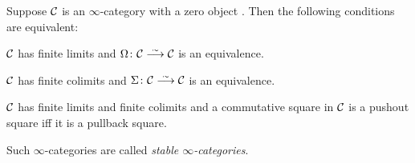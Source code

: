 \begin{propdef}\label{propdef:StableInftyCategory}
	Suppose $\mathcal{C}$ is an $\infty$-category with a zero object . Then the following conditions are equivalent:
	\begin{alphanumerate}
		\item $\mathcal{C}$ has finite limits and $\Omega\colon \Cc\isomorphism\Cc$ is an equivalence.
		\item $\mathcal{C}$ has finite colimits and $\Sigma\colon \Cc\isomorphism \Cc$ is an equivalence.
		\item $\mathcal{C}$ has finite limits and finite colimits and a commutative square in $\mathcal{C}$ is a pushout square iff it is a pullback square.
	\end{alphanumerate}
	Such $\infty$-categories are called \emph{stable $\infty$-categories}.
\end{propdef}
